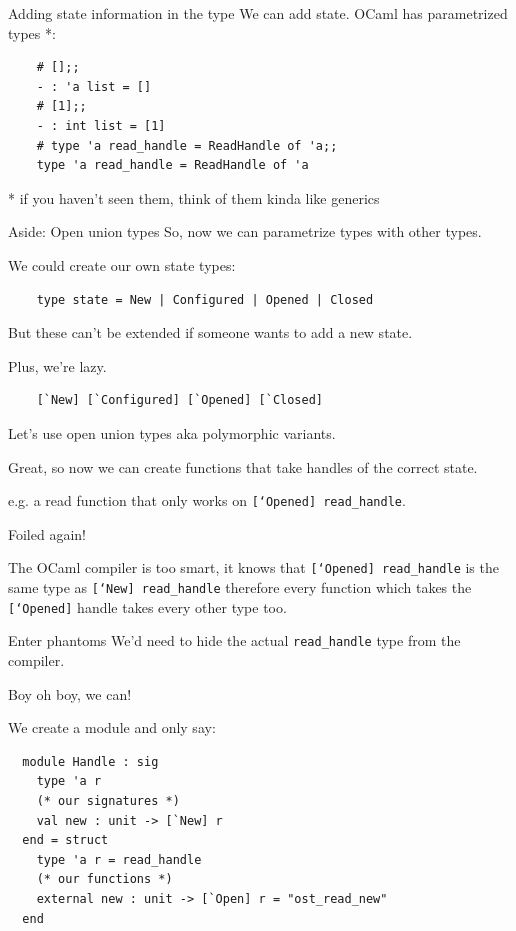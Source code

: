 \documentclass{beamer}
\renewcommand{\example}[1]{{\usebeamercolor[fg]{example text} #1}}
\begin{document}
\begin{frame}[fragile]{Adding state information in the type}
  We can add state. OCaml has parametrized types *:

  \begin{verbatim}
    # [];;
    - : 'a list = []
    # [1];;
    - : int list = [1]
    # type 'a read_handle = ReadHandle of 'a;;
    type 'a read_handle = ReadHandle of 'a
  \end{verbatim}

  * if you haven't seen them, think of them kinda like generics
\end{frame}

\begin{frame}[fragile]{Aside: Open union types}
  So, now we can \example{parametrize types with other types}.

  We could create our own state types:
  \begin{verbatim}
    type state = New | Configured | Opened | Closed
  \end{verbatim}
  \pause
  But these \alert{can't be extended} if someone wants to add a new state.
  \pause
  \vspace{2ex}

  Plus, we're lazy.
  \begin{verbatim}
    [`New] [`Configured] [`Opened] [`Closed]
  \end{verbatim}
  Let's use open union types aka polymorphic variants.
\end{frame}

\begin{frame}
  Great, so now we can create functions that take handles of the correct state.

  e.g. a read function that only works on \texttt{[`Opened] read\_handle}.

  \pause
  \alert{Foiled again!}
  \pause

  The OCaml compiler is too smart, it knows that \texttt{[`Opened] read\_handle} is the
  same type as \texttt{[`New] read\_handle} therefore every function which takes
  the \texttt{[`Opened]} handle takes every other type too.
\end{frame}

\begin{frame}[fragile]{Enter phantoms}
  \pause
  We'd need to \alert{hide} the actual \texttt{read\_handle} type from the compiler.

  \pause

  Boy oh boy, \example{we can!}

  \pause

  We create a module and only say:
  \begin{verbatim}
  module Handle : sig
    type 'a r
    (* our signatures *)
    val new : unit -> [`New] r
  end = struct
    type 'a r = read_handle
    (* our functions *)
    external new : unit -> [`Open] r = "ost_read_new"
  end
  \end{verbatim}
\end{frame}
\end{document}
